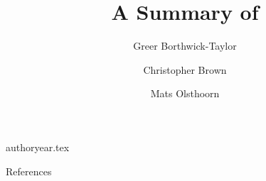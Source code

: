 

\usepackage{amsmath}
\usepackage{siunitx}
\usepackage{import}

{authoryear.tex}
\newcommand\noibidcite[1]{\citetrackerfalse\cite{#1}\citetrackertrue} %


\title{A Summary of \noibidcite{hales2017contrasting}}
\subtitle{}
\author[
	Borthwick-Taylor \and Brown \and Olsthoorn
]{
	Greer Borthwick-Taylor \and Christopher Brown \and Mats Olsthoorn
}
\date{}



\begin{frame}
	\titlepage
\end{frame}
\note{
	
}

\begin{frame}{References}
	\printbibliography
\end{frame}


